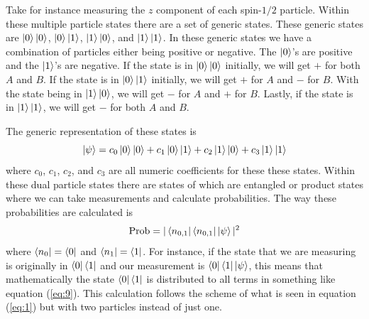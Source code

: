 \documentclass[twocolumn]{article}
\begin{document}
\newline
Take for instance measuring the $z$ component of each spin-$1/2$ particle. Within these multiple particle states there are a set of generic states. These generic states are $\ket{0}\ket{0}$, $\ket{0}\ket{1}$, $\ket{1}\ket{0}$, and $\ket{1}\ket{1}$. In these generic states we have a combination of particles either being positive or negative. The $\ket{0}$'s are positive and the $\ket{1}$'s are negative. If the state is in $\ket{0}\ket{0}$ initially, we will get $+$ for both $A$ and $B$. If the state is in $\ket{0}\ket{1}$ initially, we will get $+$ for $A$ and $-$ for $B$. With the state being in $\ket{1}\ket{0}$, we will get $-$ for $A$ and $+$ for $B$. Lastly, if the state is in $\ket{1}\ket{1}$, we will get $-$ for both $A$ and $B$.

The generic representation of these states is
\begin{equation}\label{eq:9}
\ket{\psi}=c_0\ket{0}\ket{0}+c_1\ket{0}\ket{1}+c_2\ket{1}\ket{0}+c_3\ket{1}\ket{1}
\end{equation}
where $c_0$, $c_1$, $c_2$, and $c_3$ are all numeric coefficients for these these states. Within these dual particle states there are states of which are entangled or product states where we can take measurements and calculate probabilities. The way these probabilities are calculated is
\begin{equation}\label{eq:10}
\text{Prob}=|\bra{n_{0,1}}\bra{n_{0,1}}\ket{\psi}|^2
\end{equation}
where $\bra{n_0}=\bra{0}$ and $\bra{n_1}=\bra{1}$. For instance, if the state that we are measuring is originally in $\bra{0}\bra{1}$ and our measurement is $\bra{0}\bra{1}\ket{\psi}$, this means that mathematically the state $\bra{0}\bra{1}$ is distributed to all terms in something like equation (\ref{eq:9}). This calculation follows the scheme of what is seen in equation (\ref{eq:1}) but with two particles instead of just one.
\end{document}
